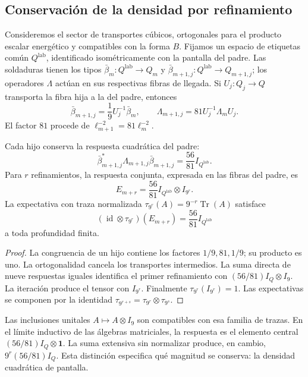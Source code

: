 \subsection{Conservación de la densidad por refinamiento}
\label{vii:vii:sec:densidad-refinamiento}

Consideremos el sector de transportes cúbicos, ortogonales para el producto
escalar energético y compatibles con la forma \(B\). Fijamos un
espacio de etiquetas común \(Q^{\mathrm{lab}}\), identificado
isométricamente con la pantalla del padre. Las soldaduras tienen
los tipos
\(\bar\beta_m:Q^{\mathrm{lab}}\longrightarrow Q_m\) y
\(\bar\beta_{m+1,j}:Q^{\mathrm{lab}}\longrightarrow Q_{m+1,j}\);
los operadores \(\Lambda\) actúan en sus respectivas fibras de llegada.
Si
\(U_j:Q_j\longrightarrow Q\) transporta la fibra hija a la del padre,
entonces
\[
 \bar\beta_{m+1,j}=\frac19U_j^{-1}\bar\beta_m,\qquad
 \Lambda_{m+1,j}=81U_j^{-1}\Lambda_mU_j.
\]
El factor \(81\) procede de \(\ell_{m+1}^{-2}=81\ell_m^{-2}\).

\begin{theorem}
\label{vii:vii:thm:densidad}
Cada hijo conserva la respuesta cuadrática del padre:
\[
 \bar\beta_{m+1,j}^*\Lambda_{m+1,j}\bar\beta_{m+1,j}
 =\frac{56}{81}I_{Q^{\mathrm{lab}}}.
\]
Para \(r\) refinamientos, la respuesta conjunta, expresada en las fibras
del padre, es
\[
 E_{m+r}=\frac{56}{81}I_{Q^{\mathrm{lab}}}\otimes I_{9^r}.
\]
La expectativa con traza normalizada
\(\tau_{9^r}(A)=9^{-r}\operatorname{Tr}(A)\) satisface
\[
 (\operatorname{id}\otimes\tau_{9^r})(E_{m+r})
 =\frac{56}{81}I_{Q^{\mathrm{lab}}}
\]
a toda profundidad finita.
\end{theorem}

\begin{proof}
La congruencia de un hijo contiene los factores \(1/9,81,1/9\);
su producto es uno. La ortogonalidad cancela los transportes
intermedios. La suma directa de nueve respuestas iguales identifica
el primer refinamiento con \((56/81)I_Q\otimes I_9\).
La iteración produce el tensor con \(I_{9^r}\).
Finalmente \(\tau_{9^r}(I_{9^r})=1\). Las expectativas se componen
por la identidad
\(\tau_{9^{r+s}}=\tau_{9^r}\otimes\tau_{9^s}\).
\end{proof}

Las inclusiones unitales \(A\mapsto A\otimes I_9\) son compatibles con
esa familia de trazas. En el límite inductivo de las álgebras matriciales,
la respuesta es el elemento central
\((56/81)I_Q\otimes\mathbf1\). La suma extensiva sin normalizar produce,
en cambio, \(9^r(56/81)I_Q\). Esta distinción especifica qué magnitud
se conserva: la densidad cuadrática de pantalla.


